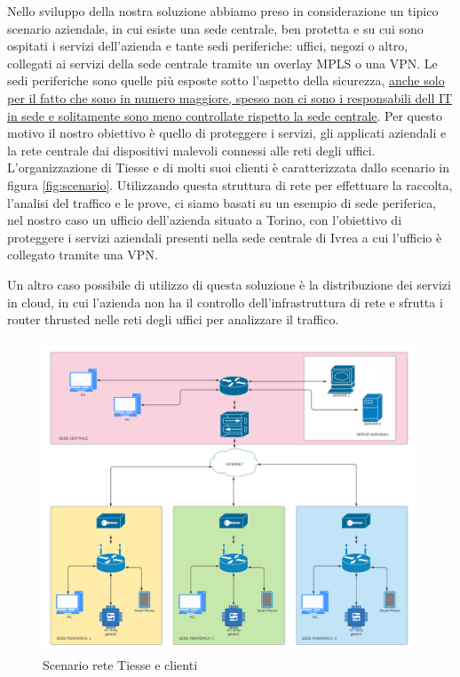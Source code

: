 Nello sviluppo della nostra soluzione abbiamo preso in considerazione un tipico scenario aziendale, in cui esiste una sede centrale, ben protetta e su cui sono ospitati i servizi dell'azienda e tante sedi periferiche: uffici, negozi o altro, collegati ai servizi della sede centrale tramite un overlay MPLS o una VPN.
Le sedi periferiche sono quelle più esposte sotto l'aspetto della sicurezza, \uline{anche solo per il fatto che sono in numero maggiore, spesso non ci sono i responsabili dell IT in sede e solitamente sono meno controllate rispetto la sede centrale}. Per questo motivo il nostro obiettivo è quello di proteggere i servizi, gli applicati aziendali e la rete centrale dai dispositivi malevoli connessi alle reti degli uffici.
L'organizzazione di Tiesse e di molti suoi clienti è caratterizzata dallo scenario in figura \ref{fig:scenario}. Utilizzando questa struttura di rete per effettuare la raccolta, l'analisi del traffico e le prove, ci siamo basati su un esempio di sede periferica, nel nostro caso un ufficio dell'azienda situato a Torino, con l'obiettivo di proteggere i servizi aziendali presenti nella sede centrale di Ivrea a cui l'ufficio è collegato tramite una VPN.

Un altro caso possibile di utilizzo di questa soluzione è la distribuzione dei servizi in cloud, in cui l'azienda non ha il controllo dell'infrastruttura di rete e sfrutta i router thrusted nelle reti degli uffici per analizzare il traffico.



\begin{figure}[]
    \label{fig:scenario_2}
    \includegraphics[width=\hsize]{images/introduzione/scenario.png}
    \caption{Scenario rete Tiesse e clienti}
    \centering
\end{figure}



